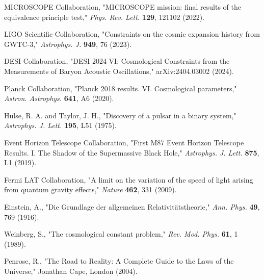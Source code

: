 \documentclass[10pt,twocolumn]{article}
\begin{document}
\onecolumn
\begin{thebibliography}{99}

MICROSCOPE Collaboration, "MICROSCOPE mission: final results of the equivalence principle test," \textit{Phys. Rev. Lett.} \textbf{129}, 121102 (2022).

LIGO Scientific Collaboration, "Constraints on the cosmic expansion history from GWTC-3," \textit{Astrophys. J.} \textbf{949}, 76 (2023).

DESI Collaboration, "DESI 2024 VI: Cosmological Constraints from the Measurements of Baryon Acoustic Oscillations," arXiv:2404.03002 (2024).

Planck Collaboration, "Planck 2018 results. VI. Cosmological parameters," \textit{Astron. Astrophys.} \textbf{641}, A6 (2020).

Hulse, R. A. and Taylor, J. H., "Discovery of a pulsar in a binary system," \textit{Astrophys. J. Lett.} \textbf{195}, L51 (1975).

Event Horizon Telescope Collaboration, "First M87 Event Horizon Telescope Results. I. The Shadow of the Supermassive Black Hole," \textit{Astrophys. J. Lett.} \textbf{875}, L1 (2019).

Fermi LAT Collaboration, "A limit on the variation of the speed of light arising from quantum gravity effects," \textit{Nature} \textbf{462}, 331 (2009).

Einstein, A., "Die Grundlage der allgemeinen Relativitätstheorie," \textit{Ann. Phys.} \textbf{49}, 769 (1916).

Weinberg, S., "The cosmological constant problem," \textit{Rev. Mod. Phys.} \textbf{61}, 1 (1989).

Penrose, R., "The Road to Reality: A Complete Guide to the Laws of the Universe," Jonathan Cape, London (2004).

\end{thebibliography}
\end{document}
